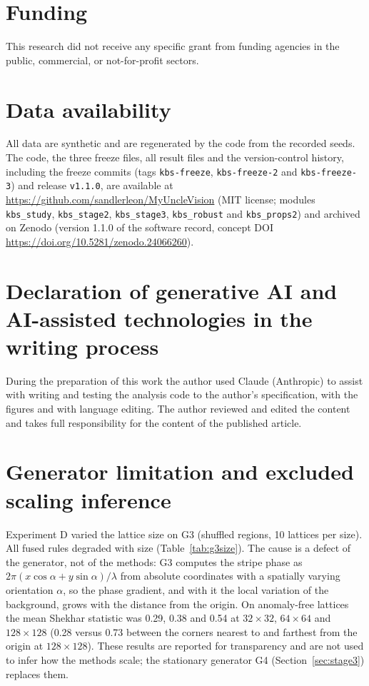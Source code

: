 \documentclass[preprint,review,12pt]{elsarticle}
\begin{document}
\section*{Funding}
This research did not receive any specific grant from funding agencies in the public, commercial, or not-for-profit sectors.

\section*{Data availability}
All data are synthetic and are regenerated by the code from the recorded seeds. The code, the three freeze files, all result files and the version-control history, including the freeze commits (tags \texttt{kbs-freeze}, \texttt{kbs-freeze-2} and \texttt{kbs-freeze-3}) and release \texttt{v1.1.0}, are available at \url{https://github.com/sandlerleon/MyUncleVision} (MIT license; modules \texttt{kbs\_study}, \texttt{kbs\_stage2}, \texttt{kbs\_stage3}, \texttt{kbs\_robust} and \texttt{kbs\_props2}) and archived on Zenodo (version 1.1.0 of the software record, concept DOI \url{https://doi.org/10.5281/zenodo.24066260}).

\section*{Declaration of generative AI and AI-assisted technologies in the writing process}
During the preparation of this work the author used Claude (Anthropic) to assist with writing and testing the analysis code to the author's specification, with the figures and with language editing. The author reviewed and edited the content and takes full responsibility for the content of the published article.

\appendix
\section{Generator limitation and excluded scaling inference}
\label{app:g3}
Experiment D varied the lattice size on G3 (shuffled regions, 10 lattices per size). All fused rules degraded with size (Table~\ref{tab:g3size}). The cause is a defect of the generator, not of the methods: G3 computes the stripe phase as $2\pi(x\cos\alpha+y\sin\alpha)/\lambda$ from absolute coordinates with a spatially varying orientation $\alpha$, so the phase gradient, and with it the local variation of the background, grows with the distance from the origin. On anomaly-free lattices the mean Shekhar statistic was 0.29, 0.38 and 0.54 at $32\times32$, $64\times64$ and $128\times128$ (0.28 versus 0.73 between the corners nearest to and farthest from the origin at $128\times128$). These results are reported for transparency and are not used to infer how the methods scale; the stationary generator G4 (Section~\ref{sec:stage3}) replaces them.
\end{document}
